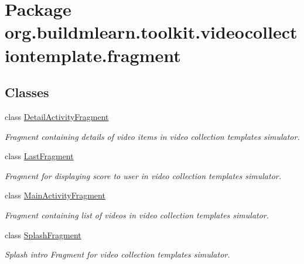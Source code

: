 \hypertarget{namespaceorg_1_1buildmlearn_1_1toolkit_1_1videocollectiontemplate_1_1fragment}{}\section{Package org.\+buildmlearn.\+toolkit.\+videocollectiontemplate.\+fragment}
\label{namespaceorg_1_1buildmlearn_1_1toolkit_1_1videocollectiontemplate_1_1fragment}
\subsection*{Classes}
\begin{DoxyCompactItemize}
\item 
class \hyperlink{classorg_1_1buildmlearn_1_1toolkit_1_1videocollectiontemplate_1_1fragment_1_1DetailActivityFragment}{Detail\+Activity\+Fragment}
\begin{DoxyCompactList}\small\item\em Fragment containing details of video items in video collection template\textquotesingle{}s simulator. \end{DoxyCompactList}\item 
class \hyperlink{classorg_1_1buildmlearn_1_1toolkit_1_1videocollectiontemplate_1_1fragment_1_1LastFragment}{Last\+Fragment}
\begin{DoxyCompactList}\small\item\em Fragment for displaying score to user in video collection template\textquotesingle{}s simulator. \end{DoxyCompactList}\item 
class \hyperlink{classorg_1_1buildmlearn_1_1toolkit_1_1videocollectiontemplate_1_1fragment_1_1MainActivityFragment}{Main\+Activity\+Fragment}
\begin{DoxyCompactList}\small\item\em Fragment containing list of videos in video collection template\textquotesingle{}s simulator. \end{DoxyCompactList}\item 
class \hyperlink{classorg_1_1buildmlearn_1_1toolkit_1_1videocollectiontemplate_1_1fragment_1_1SplashFragment}{Splash\+Fragment}
\begin{DoxyCompactList}\small\item\em Splash intro Fragment for video collection template\textquotesingle{}s simulator. \end{DoxyCompactList}\end{DoxyCompactItemize}
